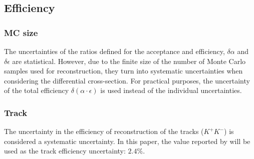 \cleardoublepage
\subsection{Efficiency}

\subsubsection{MC size}
The uncertainties of the ratios defined for the acceptance and efficiency, $\delta \alpha$ and $\delta \epsilon$ are statistical. However, due to the finite size of the number of Monte Carlo samples used for reconstruction, they turn into systematic uncertainties when considering the differential cross-section. For practical purposes, the uncertainty of the total efficiency $\delta(\alpha \cdot \epsilon)$ is used instead of the individual uncertainties.


\subsubsection{Track}

The uncertainty in the efficiency of reconstruction of the tracks ($K^{+}K^{-}$) is considered a systematic uncertainty. In this paper, the value reported by \cite{cms2018tracking} will be used as the track efficiency uncertainty: $2.4\%$.
